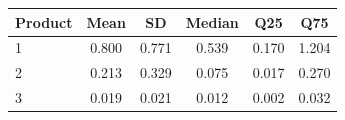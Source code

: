 \begin{tabular}{lccccc}
\toprule
Product & Mean & SD & Median & Q25 & Q75 \\
\midrule
1 & 0.800 & 0.771 & 0.539 & 0.170 & 1.204 \\
2 & 0.213 & 0.329 & 0.075 & 0.017 & 0.270 \\
3 & 0.019 & 0.021 & 0.012 & 0.002 & 0.032 \\
\bottomrule
\end{tabular}
